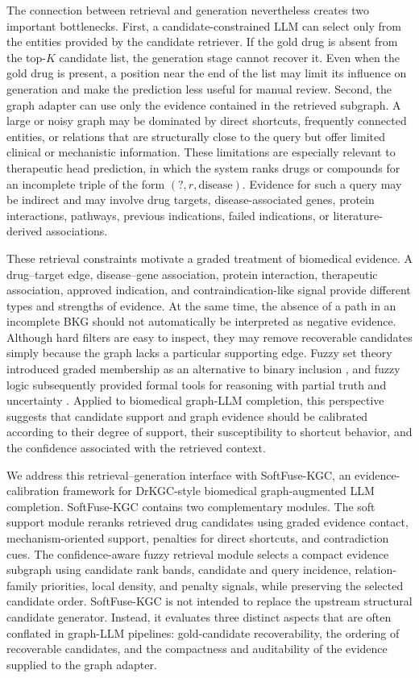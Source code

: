 \documentclass[pdflatex,sn-mathphys-num]{sn-jnl}
\newcommand{\softfuse}{SoftFuse-KGC}
\newcommand{\drkgc}{DrKGC}
\begin{document}
The connection between retrieval and generation nevertheless creates two important bottlenecks. First, a candidate-constrained LLM can select only from the entities provided by the candidate retriever. If the gold drug is absent from the top-\(K\) candidate list, the generation stage cannot recover it. Even when the gold drug is present, a position near the end of the list may limit its influence on generation and make the prediction less useful for manual review. Second, the graph adapter can use only the evidence contained in the retrieved subgraph. A large or noisy graph may be dominated by direct shortcuts, frequently connected entities, or relations that are structurally close to the query but offer limited clinical or mechanistic information. These limitations are especially relevant to therapeutic head prediction, in which the system ranks drugs or compounds for an incomplete triple of the form $(?,r,\mathrm{disease})$. Evidence for such a query may be indirect and may involve drug targets, disease-associated genes, protein interactions, pathways, previous indications, failed indications, or literature-derived associations.

These retrieval constraints motivate a graded treatment of biomedical evidence. A drug--target edge, disease--gene association, protein interaction, therapeutic association, approved indication, and contraindication-like signal provide different types and strengths of evidence. At the same time, the absence of a path in an incomplete BKG should not automatically be interpreted as negative evidence. Although hard filters are easy to inspect, they may remove recoverable candidates simply because the graph lacks a particular supporting edge. Fuzzy set theory introduced graded membership as an alternative to binary inclusion \citep{zadeh1965fuzzy}, and fuzzy logic subsequently provided formal tools for reasoning with partial truth and uncertainty \citep{prade1980fuzzy,hajek2001metamathematics,straccia2006fuzzy,lukasiewicz2008managing}. Applied to biomedical graph-LLM completion, this perspective suggests that candidate support and graph evidence should be calibrated according to their degree of support, their susceptibility to shortcut behavior, and the confidence associated with the retrieved context.

We address this retrieval--generation interface with \softfuse, an evidence-calibration framework for \drkgc{}-style biomedical graph-augmented LLM completion. \softfuse{} contains two complementary modules. The soft support module reranks retrieved drug candidates using graded evidence contact, mechanism-oriented support, penalties for direct shortcuts, and contradiction cues. The confidence-aware fuzzy retrieval module selects a compact evidence subgraph using candidate rank bands, candidate and query incidence, relation-family priorities, local density, and penalty signals, while preserving the selected candidate order. \softfuse{} is not intended to replace the upstream structural candidate generator. Instead, it evaluates three distinct aspects that are often conflated in graph-LLM pipelines: gold-candidate recoverability, the ordering of recoverable candidates, and the compactness and auditability of the evidence supplied to the graph adapter.
\end{document}
